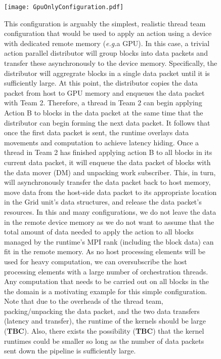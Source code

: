 \documentclass{article}
\newcommand{\eg}{\textit{e.g.}}   %
\begin{document}
\begin{appendices}
\begin{figure}[!ht]
\begin{center}
\texttt{[image: GpuOnlyConfiguration.pdf]}
\caption[]{This configuration is arguably the simplest, realistic thread team
configuration that would be used to apply an action using a device with
dedicated remote memory (\eg a GPU).  In this case, a trivial action parallel
distributor will group blocks into data packets and transfer these
asynchronously to the device memory.  Specifically, the distributor will
aggregrate blocks in a single data packet until it is sufficiently large.  At
this point, the distributor copies the data packet from host to GPU memory and
enqueues the data packet with Team 2.  Therefore, a thread in Team 2 can begin
applying Action B to blocks in the data packet at the same time that the
distributor can begin forming the next data packet.  It follows that once the first
data packet is sent, the runtime overlays data movements and computation to
achieve latency hiding.  Once a thread in Team 2 has finished applying action B
to all blocks in its current data packet, it will enqueue the data packet of
blocks with the data mover (DM) and unpacking work subscriber.  This, in turn,
will asynchronously transfer the data packet back to host memory, move
data from the host-side data packet to its appropriate location in the Grid unit's data structures, and
release the data packet's resources.  In this and many configurations, we do not
leave the data in the remote device memory as we do not want to assume that the
total amount of data needed to apply the action to all blocks managed by the
runtime's MPI rank (including the block data) can fit in the remote memory.  As
no host processing elements will be used for heavy computation, we can
oversubscribe the host processing elements with a large number of orchestration
threads.  Any computation that needs to be carried out on all blocks in the the
domain is a motivating example for this simple configuration.  Note that due to
the overheads of the thread team, packing/unpacking the data packet, and the two
data transfers (latency and transfer), the runtime of the kernels should be
large (\textbf{TBC}).  Also, there exists the possibility (\textbf{TBC}) that
the kernel runtimes could be smaller so long as the number of data packets sent
down the pipeline is sufficiently large.}
\label{fig:GpuOnlyConfig}
\end{center}
\end{figure}


\end{appendices}
\end{document}

